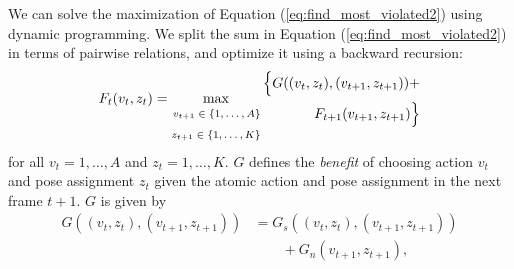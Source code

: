 %
We can solve the maximization of Equation (\ref{eq:find_most_violated2}) 
 using dynamic programming. We split the sum in Equation (\ref{eq:find_most_violated2}) in terms of pairwise relations, and optimize it using a backward recursion:
%
\begin{equation}
\label{dp_recursion}
F_t(v_t,z_t) = \max_{\begin{split} \text{\scriptsize $v_{t+1} \in \{1,\dots,A\}$\normalsize} \\ \text{\scriptsize $z_{t+1} \in \{1,\dots,K\}$\normalsize} \end{split} } \begin{split} \Bigl\{  G((v_t,z_t),(v_{t+1},z_{t+1})) + \\ F_{t+1}(v_{t+1},z_{t+1})  \Bigr\} \end{split}
\end{equation}
for all $v_t = 1,\dots,A$ and $z_t = 1,\dots,K$. $G$ defines the \emph{benefit} of choosing action $v_t$ and pose assignment $z_{t}$ given the atomic action and pose assignment in the next frame ${t+1}$. %
$G$ is given by
\begin{equation}
\begin{split}
G((v_t,z_t),(v_{t+1},z_{t+1})) & = G_s((v_t,z_t),(v_{t+1},z_{t+1})) \\ & \quad\quad + G_n(v_{t+1},z_{t+1}),
\end{split}
\end{equation}

